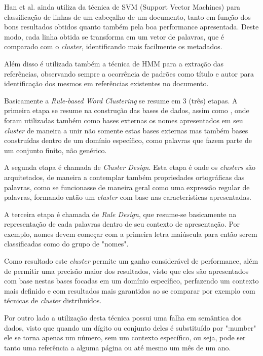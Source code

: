 \documentclass[
	12pt,               %
	openright,          %
	twoside,            %
	a4paper,            %
	english,            %
	brazil              %
	]{abntex2}
\begin{document}
Han et al. ainda utiliza da técnica  de SVM (Support Vector Machines) para classificação de linhas de um cabeçalho de um documento, tanto em função dos bons resultados obtidos quanto também pela boa performance apresentada. Deste modo, cada linha obtida se transforma em um vetor de palavras, que é comparado com o \textit{cluster}, identificando mais facilmente os metadados.

Além disso é utilizada também a técnica de HMM \cite{hmm2} para a extração das referências, observando sempre a ocorrência de padrões como título e autor para identificação dos mesmos em referências existentes no documento.

Basicamente a \textit{Rule-based Word Clustering} se resume em 3 (três) etapas. A primeira etapa se resume na construção das bases de dados, assim como \cite{svm}, onde foram utilizadas também como bases externas os nomes apresentados em seu \textit{cluster} de maneira a unir não somente estas bases externas mas também bases construídas dentro de um domínio específico, como palavras que fazem parte de um conjunto finito, não genérico.

A segunda etapa é chamada de \textit{Cluster Design}. Esta etapa é onde os \textit{clusters} são arquitetados, de maneira a contemplar também propriedades ortográficas das palavras, como se funcionasse de maneira geral como uma expressão regular de palavras, formando então um \textit{cluster} com base nas características apresentadas.

A terceira etapa é chamada de \textit{Rule Design}, que resume-se basicamente na representação de cada palavras dentro de seu contexto de apresentação. Por exemplo, nomes devem começar com a primeira letra maiúscula para então serem classificadas como do grupo de "nomes".

Como resultado este \textit{cluster} permite um ganho considerável de performance, além de permitir uma precisão maior dos resultados, visto que eles são apresentados com base nestas bases focadas em um domínio específico, perfazendo um contexto mais definido e com resultados mais garantidos ao se comparar por exemplo com técnicas de \textit{cluster} distribuídos.

Por outro lado a utilização desta técnica possui uma falha em semântica dos dados, visto que quando um dígito ou conjunto deles é substituído por ":number" ele se torna apenas um número, sem um contexto específico, ou seja, pode ser tanto uma referência a alguma página ou até mesmo um mês de um ano.
\end{document}
